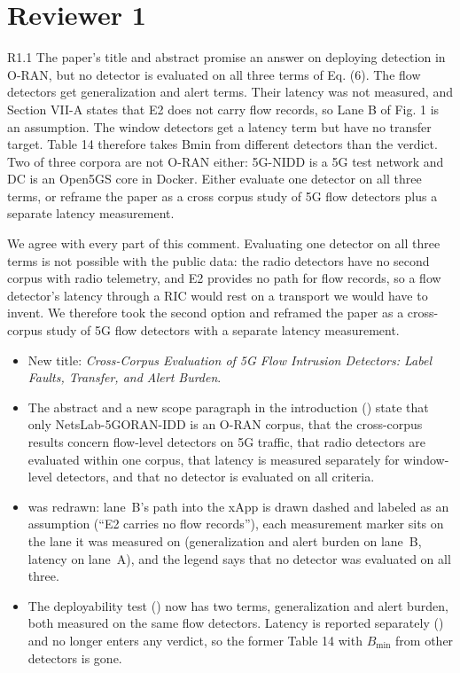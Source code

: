 \section*{Reviewer 1}

\label{rv:R1.1}
\begin{concern}{R1.1}
The paper's title and abstract promise an answer on deploying detection in O-RAN, but no detector is evaluated on all three terms of Eq. (6). The flow detectors get generalization and alert terms. Their latency was not measured, and Section VII-A states that E2 does not carry flow records, so Lane B of Fig. 1 is an assumption. The window detectors get a latency term but have no transfer target. Table 14 therefore takes Bmin from different detectors than the verdict. Two of three corpora are not O-RAN either: 5G-NIDD is a 5G test network and DC is an Open5GS core in Docker. Either evaluate one detector on all three terms, or reframe the paper as a cross corpus study of 5G flow detectors plus a separate latency measurement.
\end{concern}
\response We agree with every part of this comment. Evaluating one detector on all three terms is not possible with the public data: the radio detectors have no second corpus with radio telemetry, and E2 provides no path for flow records, so a flow detector's latency through a RIC would rest on a transport we would have to invent. We therefore took the second option and reframed the paper as a cross-corpus study of 5G flow detectors with a separate latency measurement.

\action
\begin{itemize}[leftmargin=*, itemsep=1pt]
\item New title: \emph{Cross-Corpus Evaluation of 5G Flow Intrusion Detectors: Label Faults, Transfer, and Alert Burden}.
\item The abstract and a new scope paragraph in the introduction () state that only NetsLab-5GORAN-IDD is an O-RAN corpus, that the cross-corpus results concern flow-level detectors on 5G traffic, that radio detectors are evaluated within one corpus, that latency is measured separately for window-level detectors, and that no detector is evaluated on all criteria.
\item {} was redrawn: lane~B's path into the xApp is drawn dashed and labeled as an assumption (``E2 carries no flow records''), each measurement marker sits on the lane it was measured on (generalization and alert burden on lane~B, latency on lane~A), and the legend says that no detector was evaluated on all three.
\item The deployability test () now has two terms, generalization and alert burden, both measured on the same flow detectors. Latency is reported separately () and no longer enters any verdict, so the former Table 14 with $B_{\min}$ from other detectors is gone.
\end{itemize}

